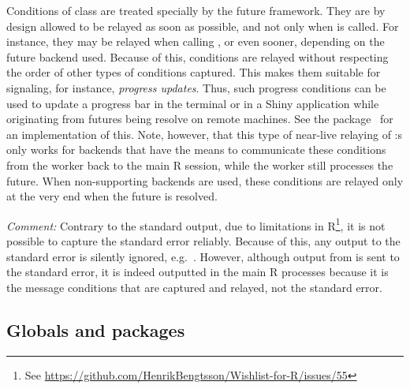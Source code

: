 Conditions of class  are treated specially by
the future framework. They are by design allowed to be relayed as soon
as possible, and not only when  is called. For instance,
they may be relayed when calling , or even sooner,
depending on the future backend used. Because of this,
 conditions are relayed without respecting
the order of other types of conditions captured. This makes them
suitable for signaling, for instance, \emph{progress updates}.  Thus,
such progress conditions can be used to update a progress bar in the
terminal or in a Shiny application while originating from futures
being resolve on remote machines.  See the 
package~\citep{CRAN:progressr} for an implementation of this.  Note,
however, that this type of near-live relaying of
:s only works for backends that have the means to
communicate these conditions from the worker back to the main R
session, while the worker still processes the future.  When
non-supporting backends are used, these conditions are relayed only at
the very end when the future is resolved.

\emph{Comment:} Contrary to the standard output, due to limitations in
R\footnote{See \url{https://github.com/HenrikBengtsson/Wishlist-for-R/issues/55}},
it is not possible to capture the standard error reliably.  Because of
this, any output to the standard error is silently ignored,
e.g.\ . However, although
output from  is sent to the standard error, it is
indeed outputted in the main R processes because it is the message
conditions that are captured and relayed, not the standard error.


\subsection{Globals and packages}
\label{global-variables}

